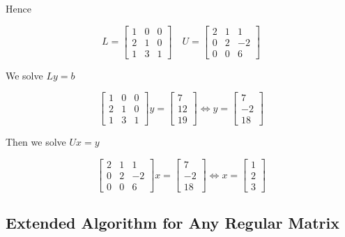 Hence 

\[
    L = 
    \begin{bmatrix}
        1 & 0 & 0 \\ 
        2 & 1 & 0 \\ 
        1 & 3 & 1
    \end{bmatrix}
    \quad 
    U = 
    \begin{bmatrix}
        2 & 1 & 1 \\ 
        0 & 2 & -2 \\ 
        0 & 0 & 6
    \end{bmatrix}
\]

We solve \(Ly = b\)

\[
    \begin{bmatrix}
        1 & 0 & 0 \\ 
        2 & 1 & 0 \\ 
        1 & 3 & 1
    \end{bmatrix}
    y 
    = 
    \begin{bmatrix}
        7 \\ 
        12 \\ 
        19
    \end{bmatrix}
    \iff 
    y = 
    \begin{bmatrix}
        7 \\ 
        -2 \\ 
        18
    \end{bmatrix}
\]

Then we solve \(Ux = y\)

\[
    \begin{bmatrix}
        2 & 1 & 1 \\ 
        0 & 2 & -2 \\ 
        0 & 0 & 6
    \end{bmatrix}
    x 
    = 
    \begin{bmatrix}
        7 \\ 
        -2 \\ 
        18
    \end{bmatrix} 
    \iff
    x = 
    \begin{bmatrix}
        1 \\ 
        2 \\ 
        3
    \end{bmatrix} 
\]

\subsection{Extended Algorithm for Any Regular Matrix}

